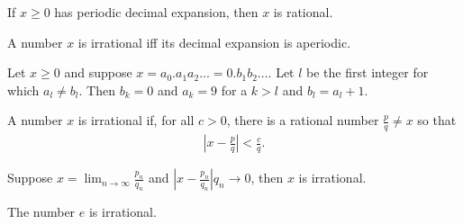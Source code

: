 \documentclass{article}
\begin{document}
\begin{theorem}
	If $x\geq 0$ has periodic decimal expansion, then $x$ is rational.
\end{theorem}
\begin{theorem}
	A number $x$ is irrational iff its decimal expansion is aperiodic.
\end{theorem}
\begin{theorem}
	Let $x\geq 0$ and suppose $x=a_0.a_1a_2...=0.b_1b_2....$ Let $l$ be the first integer for which $a_l\not=b_l$. Then $b_k=0$ and $a_k=9$ for a $k>l$ and $b_l=a_l+1$.
\end{theorem}
\begin{theorem}
	A number $x$ is irrational if, for all $c>0$, there is a rational number $\frac{p}{q}\not=x$ so that
	\begin{align*}
		\left|x-\frac{p}{q}\right|<\frac{c}{q}.
	\end{align*}
\end{theorem}
\begin{theorem}
	Suppose $x=\lim_{n\to\infty}\frac{p_n}{q_n}$ and $\left|x-\frac{p_n}{q_n}\right|q_n \to 0$, then $x$ is irrational.
\end{theorem}
\begin{theorem}
	The number $e$ is irrational.
\end{theorem}
\end{document}
